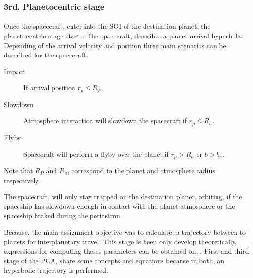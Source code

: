 \subsubsection{3rd. Planetocentric stage }
\paragraph{} Once the spacecraft, enter into the SOI of the destination planet, the planetocentric stage starts. The spacecraft, describes a planet arrival hyperbola. Depending of the arrival velocity and position three main scenarios can be described for the spacecraft.

\begin{description}
	\item[Impact] If arrival position $r_p \leq R_P$.
	\item[Slowdown] Atmosphere interaction will slowdown the spacecraft if $r_p \leq R_a$.
	\item[Flyby] Spacecraft will perform a flyby over the planet if $r_p > R_a$ or $b > b_a$.	
\end{description}

Note that $R_P$ and $R_a$, correspond to the planet and atmosphere radius respectively.

The spacecraft, will only stay trapped on the destination planet, orbiting, if the spaceship has slowdown enough in contact with the planet atmosphere or the spaceship braked during the periastron.

Because, the main assignment objective was to calculate, a trajectory between to planets for interplanetary travel. This stage is been only develop theoretically, expressions for computing theses parameters can be obtained on, \cite{PCA}. First and third stage of the PCA, share some concepts and equations because in both, an hyperbolic trajectory is performed.